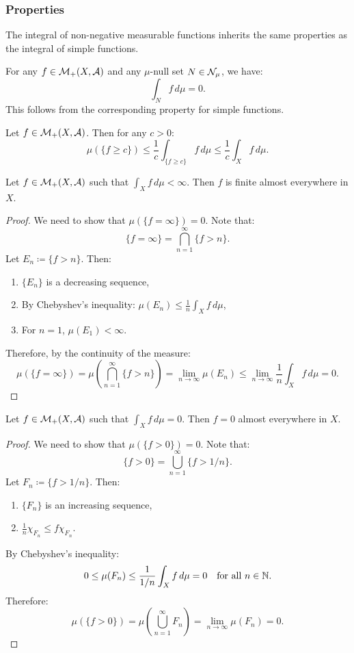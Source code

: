 \subsubsection{Properties}

The integral of non-negative measurable functions inherits the same properties as the integral of simple functions.

\begin{remark}
For any $f \in \mathcal{M}_+(X, \mathcal{A})$ and any $\mu$-null set $N \in \mathcal{N}_\mu$, we have:
\[
\int_N f \, d\mu = 0.
\]
This follows from the corresponding property for simple functions.
\end{remark}

\begin{theorem}
Let $f \in \mathcal{M}_+(X, \mathcal{A})$. Then for any $c > 0$:
\[
\mu(\{f \geq c\}) \leq \frac{1}{c} \int_{\{f \geq c\}} f \, d\mu \leq \frac{1}{c} \int_X f \, d\mu.
\]
\end{theorem}

\clearpage
\begin{proposition}
Let $f \in \mathcal{M}_+(X, \mathcal{A})$ such that $\int_X f \, d\mu < \infty$. Then $f$ is finite almost everywhere in $X$.
\end{proposition}

\begin{proof}
We need to show that $\mu(\{f = \infty\}) = 0$. Note that:
\[
\{f = \infty\} = \bigcap_{n=1}^{\infty} \{f > n\}.
\]
Let $E_n \coloneqq \{f > n\}$. Then:
\begin{enumerate}
    \item $\{E_n\}$ is a decreasing sequence,
    \item By Chebyshev's inequality: $\mu(E_n) \leq \frac{1}{n} \int_X f \, d\mu$,
    \item For $n = 1$, $\mu(E_1) < \infty$.
\end{enumerate}
Therefore, by the continuity of the measure:
\[
\mu(\{f = \infty\}) = \mu\left(\bigcap_{n=1}^{\infty} \{f > n\}\right) = \lim_{n \to \infty} \mu(E_n) \leq \lim_{n \to \infty} \frac{1}{n} \int_X f \, d\mu = 0.
\]
\end{proof}

\begin{lemma}
Let $f \in \mathcal{M}_+(X, \mathcal{A})$ such that $\int_X f \, d\mu = 0$. Then $f = 0$ almost everywhere in $X$.
\end{lemma}

\begin{proof}
We need to show that $\mu(\{f > 0\}) = 0$. Note that:
\[
\{f > 0\} = \bigcup_{n=1}^{\infty} \{f > 1/n\}.
\]
Let $F_n \coloneqq \{f > 1/n\}$. Then:
\begin{enumerate}
    \item $\{F_n\}$ is an increasing sequence,
    \item $\frac{1}{n} \chi_{F_n} \leq f\chi_{F_n}$.
\end{enumerate}
By Chebyshev's inequality:
\[
0 \leq \mu(F_n) \leq \frac{1}{1/n} \int_X f \, d\mu = 0 \quad \text{for all } n \in \mathbb{N}.
\]
Therefore:
\[
\mu(\{f > 0\}) = \mu\left(\bigcup_{n=1}^{\infty} F_n\right) = \lim_{n \to \infty} \mu(F_n) = 0.
\]
\end{proof}


